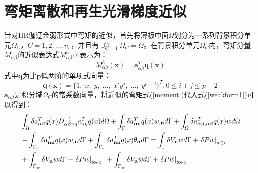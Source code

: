 \documentclass[a4paper]{article}
\begin{document}
\section{弯矩离散和再生光滑梯度近似}
针对HR伽辽金弱形式中弯矩的近似，首先将薄板中面$\Omega$划分为一系列背景积分单元$\Omega_C$，$C=1,2,\dots,n_c$，并且有$\cup_{C=1}^{n_c}\Omega_C=\Omega$。在背景积分单元$\Omega_C$内，弯矩分量$M_{\alpha\beta}$的近似表达式$M^h_{\alpha\beta}$可表示为：
\begin{equation}\label{moment}
    M_{\alpha\beta}^h(\pmb{x})=\pmb{a}^T_{\alpha\beta}\pmb{q}(\pmb{x})
\end{equation}
式中$\pmb{q}$为比$\pmb{p}$低两阶的单项式向量：
\begin{equation}
    \pmb{q}(\pmb{x})=\{1,\;x,\;y,\;\dots,\;x^iy^j,\;\dots,\;y^{p-2}\}^T,0 \le i+j \le p-2
\end{equation}
$\pmb a_{\alpha\beta}$是积分域$\Omega_C$的常系数向量，将近似的弯矩式(\ref{moment})代入式(\ref{weakform1})可以得到：
\begin{equation}
    \begin{split}
        &\int_\Omega {\delta a_{\alpha\beta}^T{q}({x})D_{\alpha \beta \gamma \eta }^{ - 1}{a_{\gamma\eta}^Tq(x)}d\Omega }+\int_\Gamma  {\delta a_{\bf{nn}}^Tq(x){w_{,{\bf{n}}}}d\Gamma }+\int_\Omega  {\delta a_{\alpha\beta,\alpha\beta}^Tq(x)wd\Omega }\\
        &-\int_{{\Gamma _\theta }} {\delta a_{\bf{nn}}^Tq(x){w_{,{\bf{n}}}}d\Gamma }+\int_{{\Gamma _\theta }} {\delta a_{\bf{nn}}^Tq(x){{\bar \theta }_{\bf{n}}}d\Gamma }=\int_\Gamma  {\delta {V_{\bf{n}}}wd\Gamma }+{\left. {\delta Pw} \right|_{{\bf{x}} \in c}}\\
        &+\int_{{\Gamma _w}} {\delta {V_{\bf{n}}}wd\Gamma }-{\left. {\delta Pw} \right|_{{\bf{x}} \in {c_w}}}+\int_{{\Gamma _w}} {\delta {V_{\bf{n}}}\bar wd\Gamma } + {\left. {\delta P\bar w} \right|_{{\bf{x}} \in {c_w}}}
    \end{split}
\end{equation}
\end{document}
